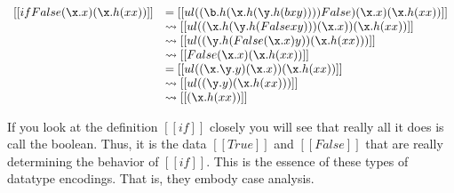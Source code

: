 \documentclass{article}
\newcommand {\redto}[0]{\rightsquigarrow}
\begin{document}
\begin{center}
  \begin{math}
    \begin{array}{lll}
      [[if False (\x.x) (\x.h(x x))]] 
      & = [[ul((\b.h(\x.h(\y.h(b x y)))) False) (\x.x) (\x.h(x x))]]\\
      & \redto [[ul((\x.h(\y.h(False x y))) (\x.x)) (\x.h(x x))]]\\
      & \redto [[ul((\y.h(False (\x.x) y)) (\x.h(x x)))]]\\
      & \redto [[False (\x.x) (\x.h(x x)) ]]\\
      & = [[ul((\x.\y.y) (\x.x)) (\x.h(x x)) ]]\\
      & \redto [[ul((\y.y) (\x.h(x x))) ]]\\
      & \redto [[(\x.h(x x))]]\\
    \end{array}
  \end{math}
\end{center}

If you look at the definition $[[if]]$ closely you will see that
really all it does is call the boolean.  Thus, it is the data
$[[True]]$ and $[[False]]$ that are really determining the behavior of
$[[if]]$.  This is the essence of these types of datatype encodings.
That is, they embody case analysis.
\end{document}
